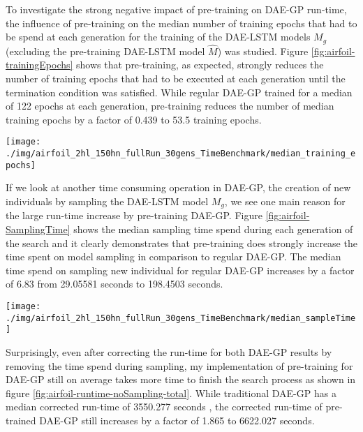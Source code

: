 \documentclass[
  11pt,
]{article}
\let\origfigure\figure
\let\endorigfigure\endfigure
\renewenvironment{figure}[1][2] {
    \expandafter\origfigure\expandafter[H]
} {
    \endorigfigure
}
\begin{document}
To investigate the strong negative impact of pre-training on DAE-GP run-time, the influence of pre-training on the median number of training epochs that had to be spend at each generation for the training of the DAE-LSTM models \(M_g\) (excluding the pre-training DAE-LSTM model \(\hat{M}\)) was studied.
Figure \ref{fig:airfoil-trainingEpochs} shows that pre-training, as expected, strongly reduces the number of training epochs that had to be executed at each generation until the termination condition was satisfied.
While regular DAE-GP trained for a median of 122 epochs at each generation, pre-training reduces the number of median training epochs by a factor of 0.439 to 53.5 training epochs.

\begin{figure}[c]

{\centering \texttt{[image: ./img/airfoil\_2hl\_150hn\_fullRun\_30gens\_TimeBenchmark/median\_training\_epochs]} 

}

\caption{Median Number of Training Epochs per Generation - Airfoil}\label{fig:airfoil-trainingEpochs}
\end{figure}

If we look at another time consuming operation in DAE-GP, the creation of new individuals by sampling the DAE-LSTM model \(M_g\), we see one main reason for the large run-time increase by pre-training DAE-GP.
Figure \ref{fig:airfoil-SamplingTime} shows the median sampling time spend during each generation of the search and it clearly demonstrates that pre-training does strongly increase the time spent on model sampling in comparison to regular DAE-GP.
The median time spend on sampling new individual for regular DAE-GP increases by a factor of 6.83 from 29.05581 seconds to 198.4503 seconds.

\begin{figure}[c]

{\centering \texttt{[image: ./img/airfoil\_2hl\_150hn\_fullRun\_30gens\_TimeBenchmark/median\_sampleTime]} 

}

\caption{Median Sampling Time per Generation - Airfoil}\label{fig:airfoil-SamplingTime}
\end{figure}

Surprisingly, even after correcting the run-time for both DAE-GP results by removing the time spend during sampling, my implementation of pre-training for DAE-GP still on average takes more time to finish the search process as shown in figure \ref{fig:airfoil-runtime-noSampling-total}.
While traditional DAE-GP has a median corrected run-time of 3550.277 seconds , the corrected run-time of pre-trained DAE-GP still increases by a factor of 1.865 to 6622.027 seconds.
\end{document}
